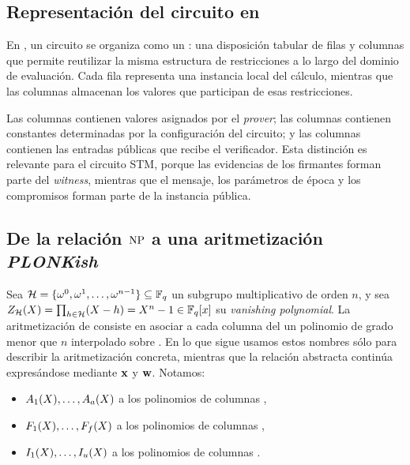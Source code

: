 \subsection{Representación del circuito en \HaloTwo}
\label{subsec:stm-halo2-y-complejidad-representacion-del-circuito-en-halotwo}

En \HaloTwo, un circuito se organiza como un \Layout: una disposición tabular de filas y columnas que permite reutilizar la misma estructura de restricciones a lo largo del dominio de evaluación. Cada fila representa una instancia local del cálculo, mientras que las columnas almacenan los valores que participan de esas restricciones.

Las columnas \Advice contienen valores asignados por el \textit{prover}; las columnas \Fixed contienen constantes determinadas por la configuración del circuito; y las columnas \Instance contienen las entradas públicas que recibe el verificador. Esta distinción es relevante para el circuito STM, porque las evidencias de los firmantes forman parte del \textit{witness}, mientras que el mensaje, los parámetros de época y los compromisos forman parte de la instancia pública.

\subsection{De la relación \texorpdfstring{\(\mathrm{NP}\)}{NP} a una aritmetización \textit{PLONKish}}
\label{subsec:stm-halo2-y-complejidad-de-la-relacion-np-a-una-aritmetizacion-plonkish}

Sea $\mathcal{H} = \{\omega^0,\omega^1,\ldots,\omega^{n-1}\} \subseteq \mathbb{F}_q$ un subgrupo multiplicativo de orden $n$, y sea $Z_{\mathcal{H}}(X) = \prod_{h \in \mathcal{H}} (X - h) = X^n - 1 \in \mathbb{F}_q[x]$ su \textit{vanishing polynomial}. La aritmetización de \HaloTwo consiste en asociar a cada columna del \Layout un polinomio de grado menor que $n$ interpolado sobre \EvalDomain. En lo que sigue usamos estos nombres sólo para describir la aritmetización concreta, mientras que la relación abstracta continúa expresándose mediante $\mathbf{x}$ y $\mathbf{w}$. Notamos:
\begin{itemize}[noitemsep]
	\item $A_{1}(X), \ldots, A_{a}(X)$ a los polinomios de columnas \Advice,
	\item $F_{1}(X), \ldots, F_{f}(X)$ a los polinomios de columnas \Fixed,
	\item $I_{1}(X), \ldots, I_{u}(X)$ a los polinomios de columnas \Instance.
\end{itemize}


